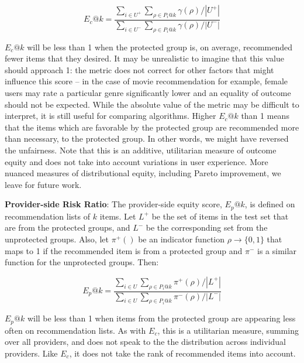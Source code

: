         \begin{equation}
        E_c@k=\frac{\sum_{i \in U^+}{\sum_{\rho \in P_i@k}{\gamma(\rho)}}/|U^+|}
        {\sum_{i \in U^-}{\sum_{\rho \in P_i@k}{\gamma(\rho)}}/|U^-|}
        \end{equation}
        
        
        $E_c@k$ will be less than 1 when the protected group is, on average, recommended fewer items that they desired. It may be unrealistic to imagine that this value should approach 1: the metric does not correct for other factors that might influence this score -- in the case of movie recommendation for example, female users may rate a particular genre significantly lower and an equality of outcome should not be expected.
        While the absolute value of the metric may be difficult to interpret, it is still useful for comparing algorithms. Higher $E_c@k$ than 1 means that the items which are favorable by the protected group are recommended more than necessary, to the protected group. In other words, we might have reversed the unfairness. Note that this is an additive, utilitarian measure of outcome equity and does not take into account variations in user experience. More nuanced measures of distributional equity, including Pareto improvement, we leave for future work.
        
        
        \textbf{Provider-side Risk Ratio}: The provider-side equity score, $E_p@k$, is defined on recommendation lists of $k$ items. Let $L^+$ be the set of items in the test set that are from the protected groups, and $L^-$ be the corresponding set from the unprotected groups. Also, let $\pi^+()$ be an indicator function $\rho \rightarrow \{0,1\}$ that maps to 1 if the recommended item is from a protected group and $\pi^-$ is a similar function for the unprotected groups. Then:

        \begin{equation}
        E_p@k=\frac{\sum_{i \in U}{\sum_{\rho \in P_i@k}{\pi^+(\rho)}}/|L^+|}
        {\sum_{i \in U}{\sum_{\rho \in P_i@k}{\pi^-(\rho)}}/|L^-|}
        \end{equation}
        
        $E_p@k$ will be less than 1 when items from the protected group are appearing less often on recommendation lists. As with $E_c$, this is a utilitarian measure, summing over all providers, and does not speak to the the distribution across individual providers. Like $E_c$, it does not take the rank of recommended items into account.


